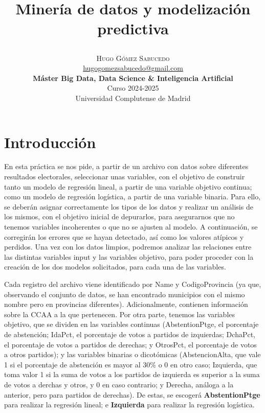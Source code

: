 \documentclass[a4paper,onecolumn]{article}
\title{\begin{center} \Huge Minería de datos y modelización predictiva \end{center}} %
\author{
    \textsc{\Huge Hugo Gómez Sabucedo} \\ %
    \large \href{mailto:hugogomezsabucedo@gmail.com}{hugogomezsabucedo@gmail.com} \\ [2ex] %
    \Large \textbf{Máster Big Data, Data Science \& Inteligencia Artificial} \\
    \normalsize Curso 2024-2025 \\
    \large Universidad Complutense de Madrid
}
\date{} %
\begin{document}
\maketitle
\tableofcontents
\begin{sloppypar}


\section{Introducción} \label{enunciado}
En esta práctica se nos pide, a partir de un archivo con datos sobre diferentes resultados electorales, seleccionar unas variables, con el objetivo
de construir tanto un modelo de regresión lineal, a partir de una variable objetivo continua; como un modelo de regresión logística, a partir de una
variable binaria. Para ello, se deberán asignar correctamente los tipos de los datos y realizar un análisis de los mismos, con el objetivo inicial 
de depurarlos, para asegurarnos que no tenemos variables incoherentes o que no se ajusten al modelo. A continuación, se corregirán los errores que se 
hayan detectado, así como los valores atípicos y perdidos. Una vez con los datos limpios, podremos analizar las relaciones entre las distintas variables 
input y las variables objetivo, para poder proceder con la creación de los dos modelos solicitados, para cada una de las variables.

Cada registro del archivo viene identificado por Name y CodigoProvincia (ya que, observando el conjunto de datos, se han encontrado municipios con el mismo
nombre pero en provincias diferentes). Adicionalmente, contienen información sobre la CCAA a la que pertenecen. Por otra parte, tenemos las variables objetivo,
que se dividen en las variables continuas (AbstentionPtge, el porcentaje de abstención; IdaPct, el porcentaje de votos a partidos de izquierdas; DchaPct, el
porcentaje de votos a partidos de derechas; y OtrosPct, el porcentaje de votos a otros partidos); y las variables binarias o dicotómicas (AbstencionAlta, que 
vale 1 si el porcentaje de abstención es mayor al 30\% o 0 en otro caso; Izquierda, que toma valor 1 si la suma de votos a los partidos de izquierda es 
superior a la suma de votos a derchas y otros, y 0 en caso contrario; y Derecha, análoga a la anterior, pero para partidos de derechas). De estas, se
escogerá \textbf{AbstentionPtge} para realizar la regresión lineal; e \textbf{Izquierda} para realizar la regresión logística.


\end{sloppypar}
\end{document}
